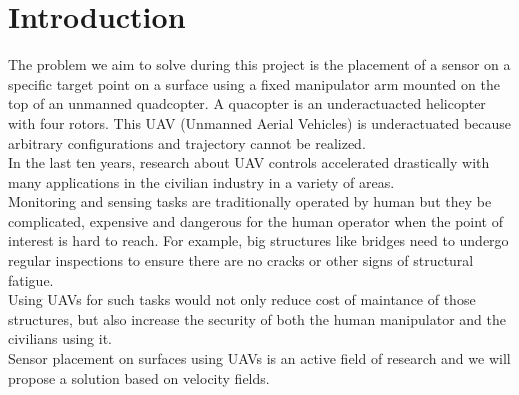 \section{Introduction}




The problem we aim to solve during this project is the placement of a sensor on a specific target point on a surface using a fixed manipulator arm mounted on the top of an unmanned quadcopter.
A quacopter is an underactuacted helicopter with four rotors. This UAV (Unmanned Aerial Vehicles) is underactuated because arbitrary configurations and trajectory cannot be realized.\\
In the last ten years, research about UAV controls accelerated drastically with many applications in the civilian industry in a variety of areas.\\
Monitoring and sensing tasks are traditionally operated by human but they be complicated, expensive and dangerous for the human operator when the point of interest is hard to reach. For example, big structures like bridges need to undergo regular inspections to ensure there are no cracks or other signs of structural fatigue.\\
Using UAVs for such tasks would not only reduce cost of maintance of those structures, but also increase the security of both the human manipulator and the civilians using it. \\
Sensor placement on surfaces using UAVs  is an active field of research and we will propose a solution based on velocity fields.\\

